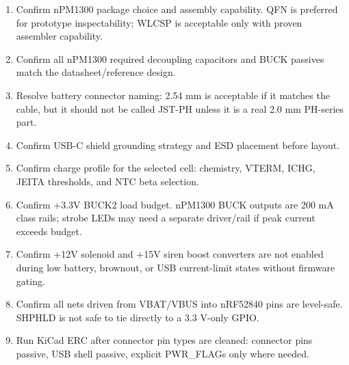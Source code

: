 \documentclass[11pt,a4paper]{article}
\begin{document}
\begin{enumerate}
  \item Confirm nPM1300 package choice and assembly capability. QFN is preferred for prototype inspectability; WLCSP is acceptable only with proven assembler capability.
  \item Confirm all nPM1300 required decoupling capacitors and BUCK passives match the datasheet/reference design.
  \item Resolve battery connector naming: 2.54 mm is acceptable if it matches the cable, but it should not be called JST-PH unless it is a real 2.0 mm PH-series part.
  \item Confirm USB-C shield grounding strategy and ESD placement before layout.
  \item Confirm charge profile for the selected cell: chemistry, VTERM, ICHG, JEITA thresholds, and NTC beta selection.
  \item Confirm +3.3V BUCK2 load budget. nPM1300 BUCK outputs are 200 mA class rails; strobe LEDs may need a separate driver/rail if peak current exceeds budget.
  \item Confirm +12V solenoid and +15V siren boost converters are not enabled during low battery, brownout, or USB current-limit states without firmware gating.
  \item Confirm all nets driven from VBAT/VBUS into nRF52840 pins are level-safe. SHPHLD is not safe to tie directly to a 3.3 V-only GPIO.
  \item Run KiCad ERC after connector pin types are cleaned: connector pins passive, USB shell passive, explicit PWR\_FLAGs only where needed.
\end{enumerate}
\end{document}
